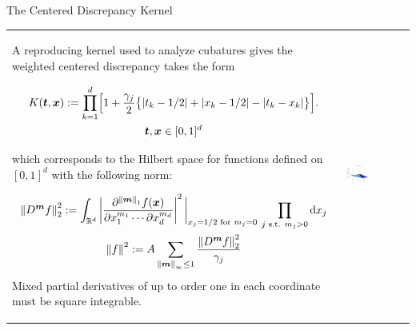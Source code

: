 \documentclass[10pt,compress,xcolor={usenames,dvipsnames},aspectratio=169]{beamer}
\begin{document}
\begin{frame}{The Centered Discrepancy Kernel \cite{Hic97a}}
	\vspace{-2ex}
	\begin{tabular}{m{}m{}}
	A reproducing kernel used to analyze cubatures gives the weighted centered discrepancy takes the form
	
	\vspace{-4ex}
	\begin{multline*}
	K(\vt,\vx) : = \prod_{k=1}^d \Bigl[ 1 + \frac {\gamma_j}2 \bigl\{ \abs{t_k - 1/2} + \abs{x_k -1/2} - \abs{t_k-x_k} \bigr\} \Bigr]. \\
	 \vt, \vx \in [0,1]^d
	\end{multline*}

\vspace{-2ex}
which corresponds to the Hilbert space for functions defined on $[0,1]^d$ with the following norm:

	\vspace{-4ex}
		\begin{gather*}
			\norm[2]{D^{\vm} f}^2 := \int_{\reals^d} \abs{\frac{\partial^{\norm[1]{\vm}}f(\vx)}{\partial x_1^{m_1} \cdots \partial x_d^{m_d}}}^2 \bigg \rvert_{x_j = 1/2 \text{ for } m_j = 0} \, \prod_{j \text{ s.t. } m_j > 0} \dif x_j  \\
			\norm{f}^2 : = A \sum_{\norm[\infty]{\vm} \le 1} \frac{\norm[2]{D^{\vm} f}^2}{\gamma_j}
		\end{gather*}
	Mixed partial derivatives of up to order one in each coordinate must be square integrable.
	&
		\includegraphics[width=0.38\textwidth]{RK2-ctrdiscker.eps}
		\end{tabular}
\end{frame}
\end{document}
